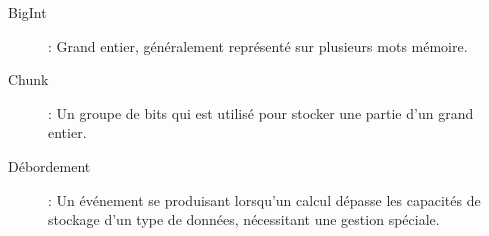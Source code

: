 \begin{description}
    \item[BigInt] : Grand entier, généralement représenté sur plusieurs mots mémoire.
    \item[Chunk] : Un groupe de bits qui est utilisé pour stocker une partie d'un grand entier.
    \item[Débordement] : Un événement se produisant lorsqu'un calcul dépasse les capacités de stockage d'un type de données, nécessitant une gestion spéciale.
\end{description}
